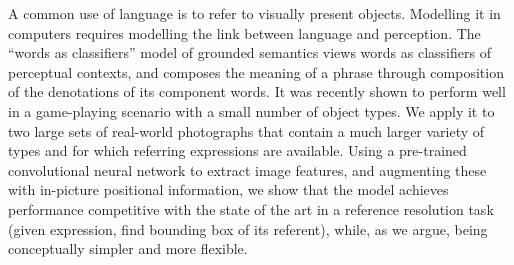 A common use of language is to refer to visually present objects. Modelling it in computers requires modelling the link between language and perception. The ``words as classifiers'' model of grounded semantics views words as classifiers of perceptual contexts, and composes the meaning of a phrase through composition of the denotations of its component words. It was recently shown to perform well in a game-playing scenario with a small number of object types. We apply it to two large sets of real-world photographs that contain a much larger variety of types and for which referring expressions are available. Using a pre-trained convolutional neural network to extract image features, and augmenting these with in-picture positional information, we show that the model achieves performance competitive with the state of the art in a reference resolution task (given expression, find bounding box of its referent), while, as we argue, being conceptually simpler and more flexible.
